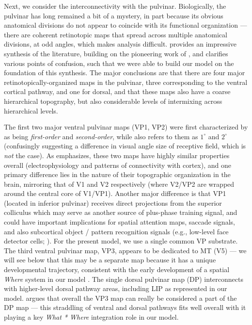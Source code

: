 \documentclass[11pt,twoside]{article}
\newif\myifpdf
\begin{document}
Next, we consider the interconnectivity with the pulvinar.  Biologically, the pulvinar has long remained a bit of a mystery, in part because its obvious anatomical divisions do not appear to coincide with its functional organization --- there are coherent retinotopic maps that spread across multiple anatomical divisions, at odd angles, which makes analysis difficult.   provides an impressive synthesis of the literature, building on the pioneering work of , and clarifies various points of confusion, such that we were able to build our model on the foundation of this synthesis.  The major conclusions are that there are four major retinotopically-organized maps in the pulvinar, three corresponding to the ventral cortical pathway, and one for dorsal, and that these maps also have a coarse hierarchical topography, but also considerable levels of intermixing across hierarchical levels.

The first two major ventral pulvinar maps (VP1, VP2) were first characterized by  as being {\em first-order} and {\em second-order}, while  also refers to them as $1^\circ$ and $2^\circ$ (confusingly suggesting a difference in visual angle size of receptive field, which is {\em not} the case).  As  emphasizes, these two maps have highly similar properties overall (electrophysiology and patterns of connectivity with cortex), and one primary difference lies in the nature of their topographic organization in the brain, mirroring that of V1 and V2 respectively (where V2/VP2 are wrapped around the central core of V1/VP1).  Another major difference is that VP1 (located in inferior pulvinar) receives direct projections from the superior colliculus which may serve as another source of plus-phase training signal, and could have important implications for spatial attention maps, saccade signals, and also subcortical object / pattern recognition signals (e.g., low-level face detector cells; ). For the present model, we use a single common VP substrate.  The third ventral pulvinar map, VP3, appears to be dedicated to MT (V5) --- we will see below that this may be a separate map because it has a unique developmental trajectory, consistent with the early development of a spatial {\em Where} system in our model \cite{BridgeLeopoldBourne16}.  The single dorsal pulvinar map (DP) interconnects with higher-level dorsal pathway areas, including LIP as represented in our model.   argues that overall the VP3 map can really be considered a part of the DP map --- this straddling of ventral and dorsal pathways fits well overall with it playing a key {\em What * Where} integration role in our model.
\end{document}
